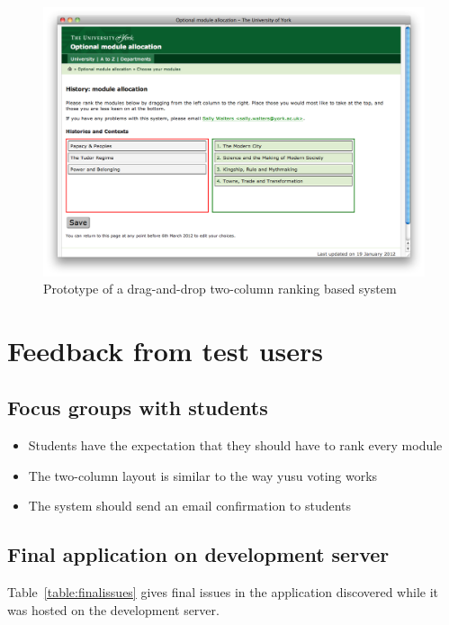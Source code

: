 \documentclass[draft]{scrartcl}
\let\stdsection\section
\renewcommand\section{\clearpage\stdsection}
\begin{document}
\begin{figure}[ht]
  \begin{center}
    \includegraphics[width=0.85\linewidth]{images/prototypes/student_prototype_3.png}
  \end{center}
  \caption{Prototype of a drag-and-drop two-column ranking based system}
  \label{prototype_student_2col}
\end{figure}

\stdsection{Feedback from test users}
\label{sec:testingfeedback}

\subsection{Focus groups with students}

\begin{itemize}
  \item Students have the expectation that they should have to rank every module
  \item The two-column layout is similar to the way \gls{yusu} voting works
  \item The system should send an email confirmation to students
\end{itemize}

\subsection{Final application on development server}

Table~\ref{table:finalissues} gives final issues in the application discovered
while it was hosted on the development server.
\end{document}
